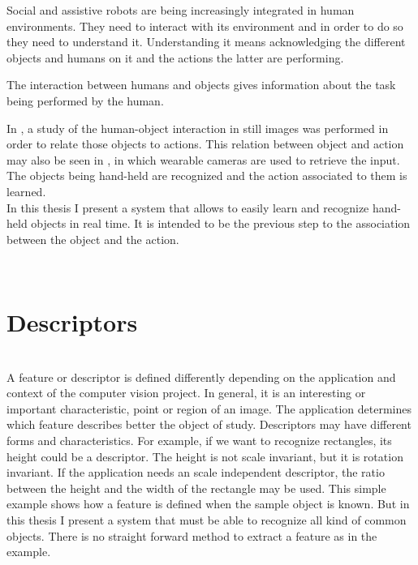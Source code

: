 
	Social and assistive robots are being increasingly integrated in human environments. 
	They need to interact with its environment and in order to do so they need to understand it. 
	Understanding it means acknowledging the different objects and humans on it and the actions the latter are performing. 

	The interaction between humans and objects gives information about the task being performed by the human. 

	In \cite{Delaitre}, a study of the human-object interaction in still images was performed in order to relate those objects to actions. 
	This relation between object and action may also be seen in \cite{Fathi}, in which wearable cameras are used to retrieve the input. 
	The objects being hand-held are recognized and the action associated to them is learned. 
	\\

	In this thesis I present a system that allows to easily learn and recognize hand-held objects in real time. 
	It is intended to be the previous step to the association between the object and the action. 


\\







\section{Descriptors}
\label{descriptors}

\\
A feature or descriptor is defined differently depending on the application and context of the computer vision project. 
In general, it is an interesting or important characteristic, point or region of an image. 
The application determines which feature describes better the object of study. 
Descriptors may have different forms and characteristics. 
For example, if we want to recognize rectangles, its height could be a descriptor.
The height is not scale invariant, but it is rotation invariant. 
If the application needs an scale independent descriptor, the ratio between the height and the width of the rectangle may be used. 
This simple example shows how a feature is defined when the sample object is known. 
But in this thesis I present a system that must be able to recognize all kind of common objects. 
There is no straight forward method to extract a feature as in the example. 
\\

